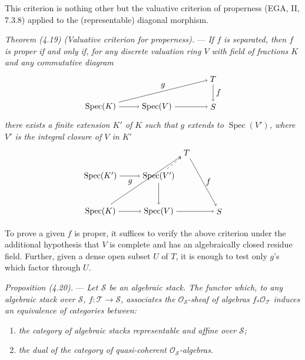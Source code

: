 \documentclass[10pt]{article}
\newcommand{\Spec}{\operatorname{Spec}}
\newcommand{\cO}{\mathcal O}
\begin{document}
This criterion is nothing other but the valuative criterion of properness (EGA, II, 7.3.8) applied to the (representable) diagonal morphism.

\medskip
\noindent\emph{Theorem (4.19) (Valuative criterion for properness).} --- \emph{If $f$ is separated, then $f$ is proper if and only if, for any discrete valuation ring $V$ with field of fractions $K$ and any commutative diagram}
\[
\begin{tikzpicture}[baseline=(current bounding box.center)]
\node (K) at (0,0) {$\Spec(K)$};
\node (V) at (2.4,0) {$\Spec(V)$};
\node (T) at (4.8,1.2) {$T$};
\node (S) at (4.8,0) {$S$};
\draw[->] (K) -- (V);
\draw[->] (V) -- (S);
\draw[->] (T) -- node[right] {$f$} (S);
\draw[->] (K) -- node[above] {$g$} (T);
\end{tikzpicture}
\]
\emph{there exists a finite extension $K'$ of $K$ such that $g$ extends to $\Spec(V')$, where $V'$ is the integral closure of $V$ in $K'$}
\[
\begin{tikzpicture}[baseline=(current bounding box.center)]
\node (Kp) at (0,1.5) {$\Spec(K')$};
\node (Vp) at (2.5,1.5) {$\Spec(V')$};
\node (T) at (3.7,2.5) {$T$};
\node (K) at (0,0) {$\Spec(K)$};
\node (V) at (2.5,0) {$\Spec(V)$};
\node (S) at (5.1,0) {$S$};
\draw[->] (Kp) -- (Vp);
\draw[->] (K) -- (V);
\draw[->] (Vp) -- (V);
\draw[->] (V) -- (S);
\draw[->] (T) -- node[right] {$f$} (S);
\draw[->] (K) -- node[pos=.35,above left] {$g$} (T);
\draw[->,dashed] (Vp) -- (T);
\end{tikzpicture}
\]

To prove a given $f$ is proper, it suffices to verify the above criterion under the additional hypothesis that $V$ is complete and has an algebraically closed residue field. Further, given a dense open subset $U$ of $T$, it is enough to test only $g$'s which factor through $U$.

\medskip
\noindent\emph{Proposition (4.20).} --- \emph{Let $\mathscr S$ be an algebraic stack. The functor which, to any algebraic stack over $\mathscr S$, $f:\mathscr T\to\mathscr S$, associates the $\cO_{\mathscr S}$-sheaf of algebras $f_*\cO_{\mathscr T}$ induces an equivalence of categories between:}
\begin{enumerate}[label=(\roman*)]
\item \emph{the category of algebraic stacks representable and affine over $\mathscr S$;}
\item \emph{the dual of the category of quasi-coherent $\cO_{\mathscr S}$-algebras.}
\end{enumerate}
\end{document}

